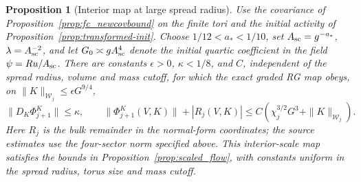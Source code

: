 \documentclass[11pt]{article}
\newtheorem{proposition}{Proposition}[section]
\begin{document}
\begin{proposition}[Interior map at large spread radius]
\label{prop:map_matching}
Use the covariance of Proposition~\ref{prop:fc_newcovbound}
on the finite tori and the initial activity of
Proposition~\ref{prop:transformed-init}. Choose
\(1/12<a_*<1/10\), set \(A_{\rm sc}=g^{-a_*}\),
\(\lambda=A_{\rm sc}^{-2}\), and let
\(G_0\asymp gA_{\rm sc}^4\) denote the initial quartic
coefficient in the field \(\psi=Ru/A_{\rm sc}\).
There are constants \(\epsilon>0\), \(\kappa<1/8\), and \(C\),
independent of the spread radius, volume and mass cutoff, for which
the exact graded RG map obeys, on \(\|K\|_{\mathcal W_j}\le
\epsilon G^{9/4}\),
\[
 \|D_K\Phi^K_{j+1}\|\le\kappa,\qquad
 \|\Phi^K_{j+1}(V,K)\|+|R_j(V,K)|
 \le C(\chi_j^{3/2}G^3+\|K\|_{\mathcal W_j}).
\]
Here \(R_j\) is the bulk remainder in the normal-form coordinates;
the source estimates use the four-sector norm specified above.
This interior-scale map satisfies
the bounds in Proposition~\ref{prop:scaled_flow},
with constants uniform in the spread radius, torus size and
mass cutoff.
\end{proposition}
\end{document}
